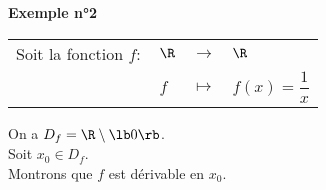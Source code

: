 \newpage

\textbf{Exemple n°2} \\

\begin{tabular}{llll}
\hspace{-.3cm} Soit la fonction $f :$ & $\R$ & $\longrightarrow$ & $\R$ \\
& $f$ & $\longmapsto$ & $f(x) = \dfrac{1}{x} $ \\
\end{tabular}

On a $D_f = \R \setminus \lb 0 \rb $. \\

Soit $x_0 \in D_f$. \\

Montrons que $f$ est dérivable en $x_0$. \\

